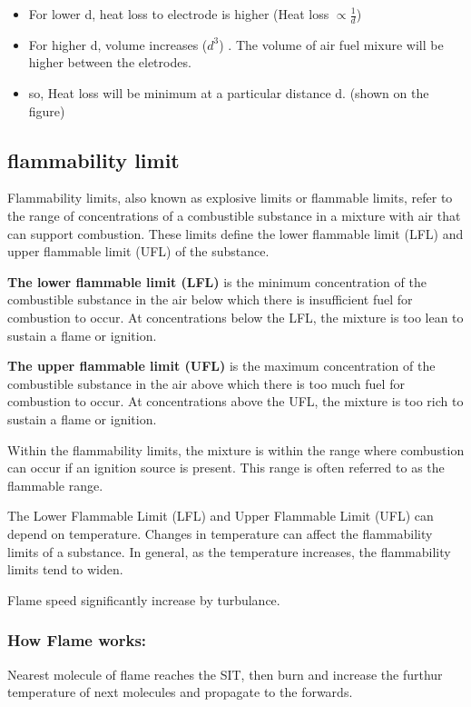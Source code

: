 \documentclass{article}
\begin{document}
  \begin{itemize}
    \item For lower d, heat loss to electrode is higher  (Heat loss $\propto \frac{1}{d}$)
    \item For higher d, volume increases ($d^3$) . The volume of air fuel mixure will be higher between the eletrodes. 
    \item so, Heat loss will be minimum at a particular distance d. (shown on the figure)
  \end{itemize}

  \subsection*{flammability limit}
  Flammability limits, also known as explosive limits or flammable limits, refer to the range of concentrations of a combustible substance in a mixture with air that can support combustion. These limits define the lower flammable limit (LFL) and upper flammable limit (UFL) of the substance.

\textbf{The lower flammable limit (LFL)} is the minimum concentration of the combustible substance in the air below which there is insufficient fuel for combustion to occur. At concentrations below the LFL, the mixture is too lean to sustain a flame or ignition.

\textbf{The upper flammable limit (UFL)} is the maximum concentration of the combustible substance in the air above which there is too much fuel for combustion to occur. At concentrations above the UFL, the mixture is too rich to sustain a flame or ignition.

Within the flammability limits, the mixture is within the range where combustion can occur if an ignition source is present. This range is often referred to as the flammable range.

The Lower Flammable Limit (LFL) and Upper Flammable Limit (UFL) can depend on temperature. Changes in temperature can affect the flammability limits of a substance. In general, as the temperature increases, the flammability limits tend to widen.

Flame speed significantly increase by turbulance. 

\subsubsection*{How Flame works:}
Nearest molecule of flame reaches the SIT, then burn and increase the furthur temperature of next molecules and propagate to the forwards. 
\end{document}
